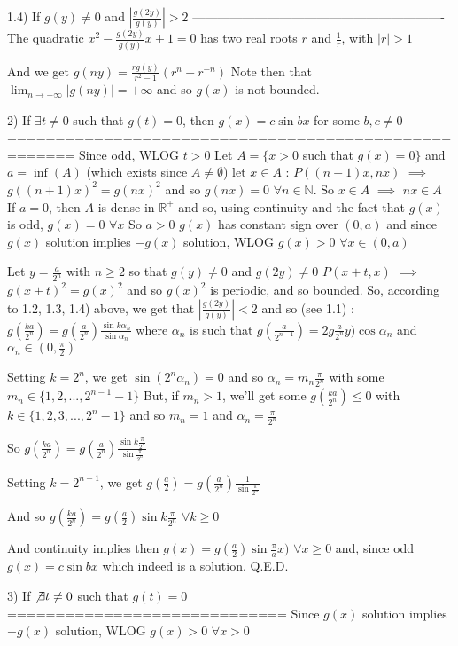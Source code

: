 \begin{solution}
1.4) If $g(y)\ne 0$ and $\left|\frac{g(2y)}{g(y)}\right|> 2$
-------------------------------------------------------------
The quadratic $x^2-\frac{g(2y)}{g(y)}x+1=0$ has two real roots $r$ and $\frac 1r$, with $|r|>1$

And we get $g(ny)=\frac{rg(y)}{r^2-1}(r^n-r^{-n})$
Note then that $\lim_{n\to+\infty}|g(ny)|=+\infty$ and so $g(x)$ is not bounded.


2) If $\exists t\ne 0$ such that $g(t)=0$, then $g(x)=c\sin bx$ for some $b,c\ne 0$
=====================================================
Since odd, WLOG $t>0$
Let $A=\{x>0$ such that $g(x)=0\}$ and $a=\inf (A)$ (which exists since $A\ne\emptyset$)
let $x\in A$ : $P((n+1)x,nx)$ $\implies$ $g((n+1)x)^2=g(nx)^2$ and so $g(nx)=0$ $\forall n\in\mathbb N$. So $x\in A$ $\implies$ $nx\in A$
If $a=0$, then $A$ is dense in $\mathbb R^+$ and so, using continuity and the fact that $g(x)$ is odd, $g(x)=0$ $\forall x$
So $a>0$
$g(x)$ has constant sign over $(0,a)$ and since $g(x)$ solution implies $-g(x)$ solution, WLOG $g(x)>0$ $\forall x\in(0,a)$

Let $y=\frac a{2^n}$ with $n\ge 2$ so that $g(y)\ne 0$ and $g(2y)\ne 0$
$P(x+t,x)$ $\implies$ $g(x+t)^2=g(x)^2$ and so $g(x)^2$ is periodic, and so bounded. So, according to 1.2, 1.3, 1.4) above, we get that $\left|\frac{g(2y)}{g(y)}\right|< 2$ and so (see 1.1) :
$g(\frac{ka}{2^n})=g(\frac a{2^n})\frac{\sin k\alpha_n}{\sin \alpha_n}$ where $\alpha_n$ is such that $g(\frac a{2^{n-1}})=2g\frac a{2^n}y)\cos\alpha_n$ and $\alpha_n\in(0,\frac{\pi}2)$

Setting $k=2^n$, we get $\sin (2^n\alpha_n)=0$ and so $\alpha_n=m_n\frac{\pi}{2^n}$ with some $m_n\in\{1,2,...,2^{n-1}-1\}$
But, if $m_n>1$, we'll get some $g(\frac{ka}{2^n})\le 0$ with $k\in\{1,2,3,...,2^n-1\}$ and so $m_n=1$ and $\alpha_n=\frac{\pi}{2^n}$

So $g(\frac{ka}{2^n})=g(\frac a{2^n})\frac{\sin k\frac{\pi}{2^n}}{\sin \frac{\pi}{2^n}}$


Setting $k=2^{n-1}$, we get $g(\frac a2)=g(\frac a{2^n})\frac{1}{\sin \frac{\pi}{2^n}}$

And so $g(\frac{ka}{2^n})=g(\frac a2)\sin{k\frac{\pi}{2^n}}$ $\forall k\ge 0$

And continuity implies then $g(x)=g(\frac a2)\sin \frac{\pi}ax)$ $\forall x\ge 0$ and, since odd $g(x)=c\sin bx$ which indeed is a solution.
Q.E.D.

3) If $\not\exists t\ne 0$ such that $g(t)=0$
=============================
Since $g(x)$ solution implies $-g(x)$ solution, WLOG $g(x)>0$ $\forall x>0$


\end{solution}
